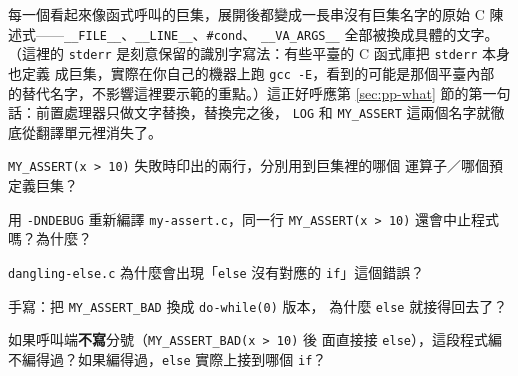 
每一個看起來像函式呼叫的巨集，展開後都變成一長串沒有巨集名字的原始
C 陳述式——\texttt{\_\_FILE\_\_}、\texttt{\_\_LINE\_\_}、\texttt{\#cond}、
\texttt{\_\_VA\_ARGS\_\_} 全部被換成具體的文字。 （這裡的 \texttt{stderr}
是刻意保留的識別字寫法：有些平臺的 C 函式庫把 \texttt{stderr} 本身也定義
成巨集，實際在你自己的機器上跑 \texttt{gcc -E}，看到的可能是那個平臺內部
的替代名字，不影響這裡要示範的重點。）這正好呼應第
\ref{sec:pp-what} 節的第一句話：前置處理器只做文字替換，替換完之後，
\texttt{LOG} 和 \texttt{MY\_ASSERT} 這兩個名字就徹底從翻譯單元裡消失了。


\begin{drills}[label=drills:pp-assert]
\item \texttt{MY\_ASSERT(x > 10)} 失敗時印出的兩行，分別用到巨集裡的哪個
運算子／哪個預定義巨集？
\item 用 \texttt{-DNDEBUG} 重新編譯 \texttt{my-assert.c}，同一行
\texttt{MY\_ASSERT(x > 10)} 還會中止程式嗎？為什麼？
\item \texttt{dangling-else.c} 為什麼會出現「\texttt{else} 沒有對應的
\texttt{if}」這個錯誤？
\item 手寫：把 \texttt{MY\_ASSERT\_BAD} 換成 \texttt{do-while(0)} 版本，
為什麼 \texttt{else} 就接得回去了？
\item 如果呼叫端\textbf{不寫}分號（\texttt{MY\_ASSERT\_BAD(x > 10)} 後
面直接接 \texttt{else}），這段程式編不編得過？如果編得過，\texttt{else}
實際上接到哪個 \texttt{if}？
\end{drills}

